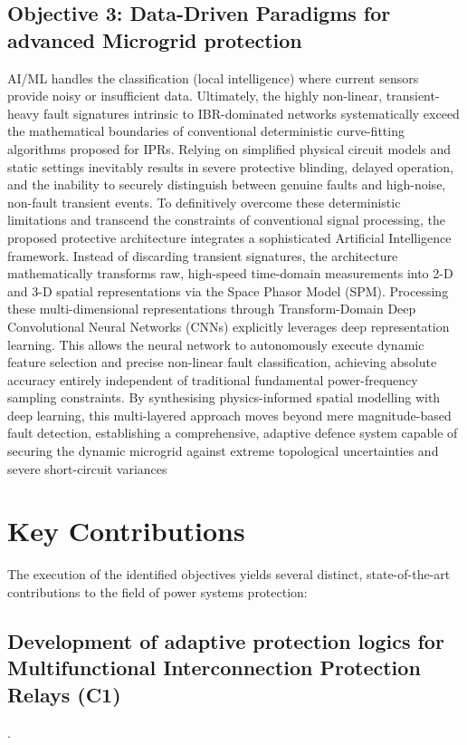 \subsection{Objective 3: Data-Driven Paradigms for advanced Microgrid protection}
AI/ML handles the classification (local intelligence) where current sensors provide noisy or insufficient data.
Ultimately, the highly non-linear, transient-heavy fault signatures intrinsic to IBR-dominated networks systematically exceed the mathematical boundaries of conventional deterministic curve-fitting algorithms proposed for IPRs. Relying on simplified physical circuit models and static settings inevitably results in severe protective blinding, delayed operation, and the inability to securely distinguish between genuine faults and high-noise, non-fault transient events. To definitively overcome these deterministic limitations and transcend the constraints of conventional signal processing, the proposed protective architecture integrates a sophisticated Artificial Intelligence framework. Instead of discarding transient signatures, the architecture mathematically transforms raw, high-speed time-domain measurements into 2-D and 3-D spatial representations via the Space Phasor Model (SPM). Processing these multi-dimensional representations through Transform-Domain Deep Convolutional Neural Networks (CNNs) explicitly leverages deep representation learning. This allows the neural network to autonomously execute dynamic feature selection and precise non-linear fault classification, achieving absolute accuracy entirely independent of traditional fundamental power-frequency sampling constraints. By synthesising physics-informed spatial modelling with deep learning, this multi-layered approach moves beyond mere magnitude-based fault detection, establishing a comprehensive, adaptive defence system capable of securing the dynamic microgrid against extreme topological uncertainties and severe short-circuit variances


\section{Key Contributions}

The execution of the identified objectives yields several distinct, state-of-the-art contributions to the field of power systems protection:


\subsection{Development of adaptive protection logics for Multifunctional Interconnection Protection Relays (C1)}.


